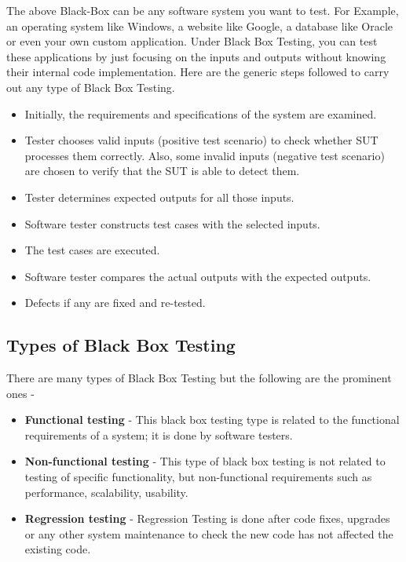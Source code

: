 \documentclass[12pt, a4paper]{report}
\begin{document}
The above Black-Box can be any software system you want to test. For Example, an operating system like Windows, a website like Google, a database like Oracle or even your own custom application. Under Black Box Testing, you can test these applications by just focusing on the inputs and outputs without knowing their internal code implementation. 
Here are the generic steps followed to carry out any type of Black Box Testing.
\begin{itemize}
	\item Initially, the requirements and specifications of the system are examined.
	\item Tester chooses valid inputs (positive test scenario) to check whether SUT processes them correctly. Also, some invalid inputs (negative test scenario) are chosen to verify that the SUT is able to detect them.
	\item Tester determines expected outputs for all those inputs.
	\item Software tester constructs test cases with the selected inputs.
	\item The test cases are executed.
	\item Software tester compares the actual outputs with the expected outputs.
	\item Defects if any are fixed and re-tested.
	
\end{itemize}

\newpage
\subsection{Types of Black Box Testing}
There are many types of Black Box Testing but the following are the prominent ones -
\begin{itemize}
	\item \textbf{Functional testing} - This black box testing type is related to the functional requirements of a system; it is done by software testers.
	\item \textbf{Non-functional testing} - This type of black box testing is not related to testing of specific functionality, but non-functional requirements such as performance, scalability, usability.
	\item \textbf{Regression testing} - Regression Testing is done after code fixes, upgrades or any other system maintenance to check the new code has not affected the existing code.
	
\end{itemize}
\end{document}
